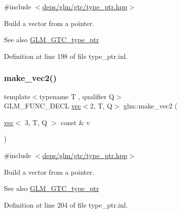 {\ttfamily \#include $<$\hyperlink{type__ptr_8hpp}{deps/glm/gtc/type\+\_\+ptr.\+hpp}$>$}

Build a vector from a pointer. \begin{DoxySeeAlso}{See also}
\hyperlink{group__gtc__type__ptr}{G\+L\+M\+\_\+\+G\+T\+C\+\_\+type\+\_\+ptr} 
\end{DoxySeeAlso}


Definition at line 198 of file type\+\_\+ptr.\+inl.

\mbox{\label{group__gtc__type__ptr_ga0084fea4694cf47276e9cccbe7b1015a}} 
\subsubsection{\texorpdfstring{make\+\_\+vec2()}{make\_vec2()}\hspace{0.1cm}{\footnotesize\ttfamily [3/5]}}
{\footnotesize\ttfamily template$<$typename T , qualifier Q$>$ \\
G\+L\+M\+\_\+\+F\+U\+N\+C\+\_\+\+D\+E\+CL \hyperlink{structglm_1_1vec}{vec}$<$2, T, Q$>$ glm\+::make\+\_\+vec2 (\begin{DoxyParamCaption}\item[{\hyperlink{structglm_1_1vec}{vec}$<$ 3, T, Q $>$ const \&}]{v }\end{DoxyParamCaption})\hspace{0.3cm}{\ttfamily [inline]}}



{\ttfamily \#include $<$\hyperlink{type__ptr_8hpp}{deps/glm/gtc/type\+\_\+ptr.\+hpp}$>$}

Build a vector from a pointer. \begin{DoxySeeAlso}{See also}
\hyperlink{group__gtc__type__ptr}{G\+L\+M\+\_\+\+G\+T\+C\+\_\+type\+\_\+ptr} 
\end{DoxySeeAlso}


Definition at line 204 of file type\+\_\+ptr.\+inl.

\mbox{\label{group__gtc__type__ptr_ga2b81f71f3a222fe5bba81e3983751249}} 
